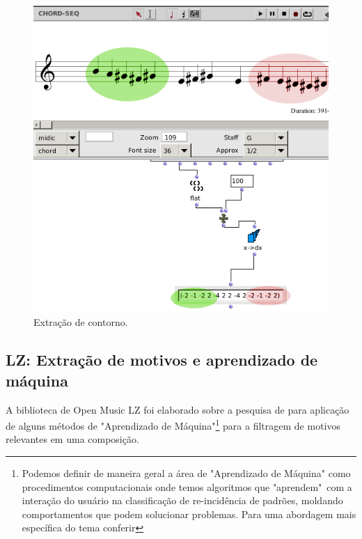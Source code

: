 \documentclass[
	12pt,				%
	openright,			%
	twoside,			%
	a4paper,			%
	english,			%
	french,				%
	spanish,			%
	brazil				%
	]{abntex2}
\begin{document}
\lipsum[9]

\begin{figure}[!h]
	\caption{\label{fig_grafico}Extração de contorno. }
	\begin{center}
	    \includegraphics[scale=0.55]{OM_settheory/x_dx.png}
	\end{center}
\end{figure}



\lipsum[11]	


\pagebreak
\subsection{LZ: Extração de motivos e aprendizado de máquina}	
\label{lz}

A biblioteca de Open Music LZ foi elaborado sobre a pesquisa de  para aplicação de alguns métodos de "Aprendizado de Máquina"\footnote{Podemos definir de maneira geral a área de "Aprendizado de Máquina" como procedimentos computacionais onde temos algoritmos que "aprendem"\ com a interação do usuário na classificação de re-incidência de padrões, moldando comportamentos que podem solucionar problemas. Para uma abordagem mais específica do tema conferir } para a filtragem de motivos relevantes em uma composição.
\end{document}
